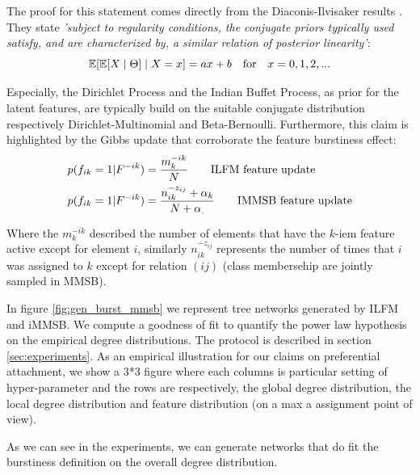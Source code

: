 The proof for this statement comes directly from the Diaconis-Ilvisaker results \cite{diaconis1979conjugate}. They state \emph{'subject to regularity conditions, the conjugate priors typically used satisfy, and are characterized by, a  similar relation of posterior linearity'}:
\begin{equation}
\mathbb{E}[\mathbb{E}[X\mid \Theta] \mid X=x] = ax+b \quad \textnormal{for} \quad x=0,1,2,... \nonumber
\end{equation}

Especially, the Dirichlet Process and the Indian Buffet Process, as prior for the latent features, are typically build on the suitable conjugate distribution respectively Dirichlet-Multinomial and Beta-Bernoulli. Furthermore, this claim is highlighted by the Gibbs update that corroborate the feature burstiness effect:
\begin{align}
&p(f_{ik} = 1 | F^{-ik}) = \frac{m_k^{-ik}}{N} \qquad \textnormal{ILFM feature update} \nonumber \\
&p(f_{ik} = 1 | F^{-ik}) = \frac{n_{ik}^{-z_{ij}}+\alpha_k}{N+\alpha_.} \qquad \textnormal{IMMSB feature update} \nonumber \\
\end{align}

Where the $m_k^{-ik}$ described the number of elements that have the $k$-iem feature active except for element $i$, similarly $n_{ik}^{-z_{ij}}$ represents the number of times that $i$ was assigned to $k$ except for relation $(ij)$ (class membersehip are jointly sampled in MMSB).

In figure \ref{fig:gen_burst_mmsb} we represent tree networks generated by ILFM and iMMSB. We compute a goodness of fit to quantify the power law hypothesis on the empirical degree distributions. The protocol is described in section \ref{sec:experiments}. As an empirical illustration for our claims on preferential attachment, we show a 3*3 figure where each columns is particular setting of hyper-parameter and the rows are respectively, the global degree distribution, the local degree distribution and feature distribution (on a max a assignment point of view).

As we can see in the experiments, we can generate networks that do fit the burstiness definition on the overall degree distribution.

